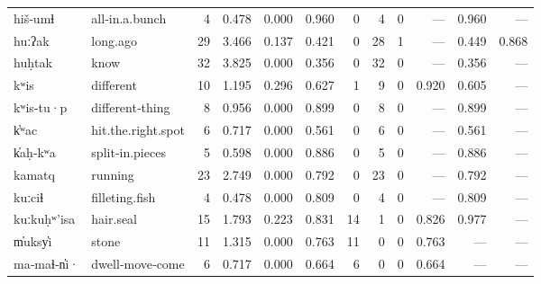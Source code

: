 \begin{landscape}
\begin{longtable}[c]{ l l | r r c c | r r r | r r r }
  hiš‑umɬ            & all‑in.a.bunch            & 4   & 0.478                     & 0.000           & 0.960      & 0         & 4           & 0            & —         & 0.960       & —\\
  huːʔak             & long.ago                  & 29  & 3.466                     & 0.137           & 0.421      & 0         & 28          & 1            & —         & 0.449       & 0.868\\
  huḥtak             & know                      & 32  & 3.825                     & 0.000           & 0.356      & 0         & 32          & 0            & —         & 0.356       & —\\
  kʷis               & different                 & 10  & 1.195                     & 0.296           & 0.627      & 1         & 9           & 0            & 0.920     & 0.605       & —\\
  kʷis‑tu·p          & different‑thing           & 8   & 0.956                     & 0.000           & 0.899      & 0         & 8           & 0            & —         & 0.899       & —\\
  k̓ʷac               & hit.the.right.spot        & 6   & 0.717                     & 0.000           & 0.561      & 0         & 6           & 0            & —         & 0.561       & —\\
  k̓aḥ‑kʷa            & split‑in.pieces           & 5   & 0.598                     & 0.000           & 0.886      & 0         & 5           & 0            & —         & 0.886       & —\\
  kamatq             & running                   & 23  & 2.749                     & 0.000           & 0.792      & 0         & 23          & 0            & —         & 0.792       & —\\
  kuːciɬ             & filleting.fish            & 4   & 0.478                     & 0.000           & 0.809      & 0         & 4           & 0            & —         & 0.809       & —\\
  kuːkuḥʷ'isa        & hair.seal                 & 15  & 1.793                     & 0.223           & 0.831      & 14        & 1           & 0            & 0.826     & 0.977       & —\\
  m̓uksy̓i             & stone                     & 11  & 1.315                     & 0.000           & 0.763      & 11        & 0           & 0            & 0.763     & —           & —\\
  ma‑maɬ‑n̓i·         & dwell‑move‑come           & 6   & 0.717                     & 0.000           & 0.664      & 6         & 0           & 0            & 0.664     & —           & —\\

\end{longtable}
\end{landscape}
